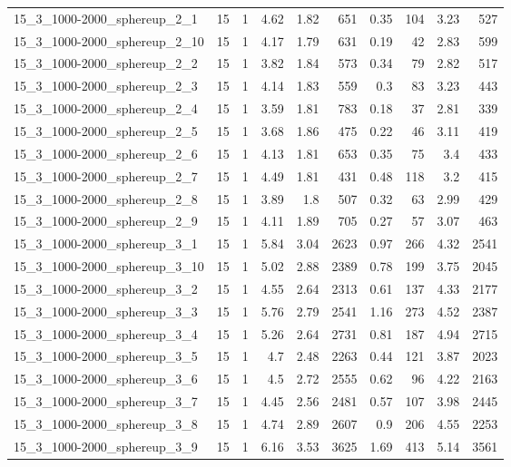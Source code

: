 \begin{center}
\begin{scriptsize}
\begin{longtable}{lrrrrrrrrr}
15\_3\_1000-2000\_sphereup\_2\_1 & 15 & 1 & 4.62 & 1.82 & 651 & 0.35 & 104 & 3.23 & 527\\
15\_3\_1000-2000\_sphereup\_2\_10 & 15 & 1 & 4.17 & 1.79 & 631 & 0.19 & 42 & 2.83 & 599\\
15\_3\_1000-2000\_sphereup\_2\_2 & 15 & 1 & 3.82 & 1.84 & 573 & 0.34 & 79 & 2.82 & 517\\
15\_3\_1000-2000\_sphereup\_2\_3 & 15 & 1 & 4.14 & 1.83 & 559 & 0.3 & 83 & 3.23 & 443\\
15\_3\_1000-2000\_sphereup\_2\_4 & 15 & 1 & 3.59 & 1.81 & 783 & 0.18 & 37 & 2.81 & 339\\
15\_3\_1000-2000\_sphereup\_2\_5 & 15 & 1 & 3.68 & 1.86 & 475 & 0.22 & 46 & 3.11 & 419\\
15\_3\_1000-2000\_sphereup\_2\_6 & 15 & 1 & 4.13 & 1.81 & 653 & 0.35 & 75 & 3.4 & 433\\
15\_3\_1000-2000\_sphereup\_2\_7 & 15 & 1 & 4.49 & 1.81 & 431 & 0.48 & 118 & 3.2 & 415\\
15\_3\_1000-2000\_sphereup\_2\_8 & 15 & 1 & 3.89 & 1.8 & 507 & 0.32 & 63 & 2.99 & 429\\
15\_3\_1000-2000\_sphereup\_2\_9 & 15 & 1 & 4.11 & 1.89 & 705 & 0.27 & 57 & 3.07 & 463\\
15\_3\_1000-2000\_sphereup\_3\_1 & 15 & 1 & 5.84 & 3.04 & 2623 & 0.97 & 266 & 4.32 & 2541\\
15\_3\_1000-2000\_sphereup\_3\_10 & 15 & 1 & 5.02 & 2.88 & 2389 & 0.78 & 199 & 3.75 & 2045\\
15\_3\_1000-2000\_sphereup\_3\_2 & 15 & 1 & 4.55 & 2.64 & 2313 & 0.61 & 137 & 4.33 & 2177\\
15\_3\_1000-2000\_sphereup\_3\_3 & 15 & 1 & 5.76 & 2.79 & 2541 & 1.16 & 273 & 4.52 & 2387\\
15\_3\_1000-2000\_sphereup\_3\_4 & 15 & 1 & 5.26 & 2.64 & 2731 & 0.81 & 187 & 4.94 & 2715\\
15\_3\_1000-2000\_sphereup\_3\_5 & 15 & 1 & 4.7 & 2.48 & 2263 & 0.44 & 121 & 3.87 & 2023\\
15\_3\_1000-2000\_sphereup\_3\_6 & 15 & 1 & 4.5 & 2.72 & 2555 & 0.62 & 96 & 4.22 & 2163\\
15\_3\_1000-2000\_sphereup\_3\_7 & 15 & 1 & 4.45 & 2.56 & 2481 & 0.57 & 107 & 3.98 & 2445\\
15\_3\_1000-2000\_sphereup\_3\_8 & 15 & 1 & 4.74 & 2.89 & 2607 & 0.9 & 206 & 4.55 & 2253\\
15\_3\_1000-2000\_sphereup\_3\_9 & 15 & 1 & 6.16 & 3.53 & 3625 & 1.69 & 413 & 5.14 & 3561\\

\end{longtable}
\end{scriptsize}
\end{center}

